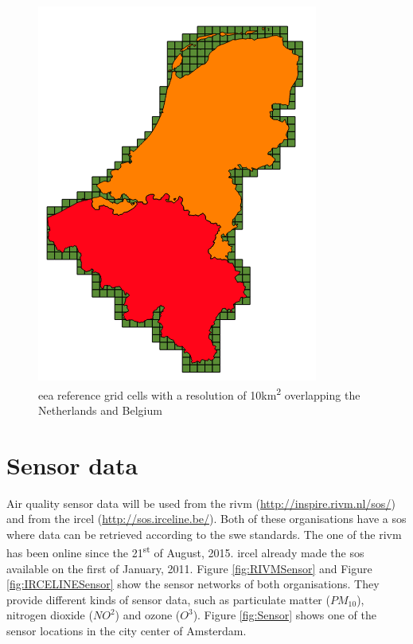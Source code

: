 \begin{figure}
	\centering
	\includegraphics[width=0.7\linewidth]{figs/EEA10km.png}
	\caption{\ac{eea} reference grid cells with a resolution of 10km\textsuperscript{2} overlapping the Netherlands and Belgium}
	\label{fig:10KM}
\end{figure}

\section{Sensor data}
Air quality sensor data will be used from the \ac{rivm} (\url{http://inspire.rivm.nl/sos/}) and from the \ac{ircel} (\url{http://sos.irceline.be/}). Both of these organisations have a \ac{sos} where data can be retrieved according to the \ac{swe} standards. The one of the \ac{rivm} has been online since the 21\textsuperscript{st} of August, 2015. \ac{ircel} already made the \ac{sos} available on the first of January, 2011. Figure \ref{fig:RIVMSensor} and Figure \ref{fig:IRCELINESensor} show the sensor networks of both organisations. They provide different kinds of sensor data, such as particulate matter ($PM_{10}$), nitrogen dioxide ($NO^{2}$) and ozone ($O^{3}$). Figure \ref{fig:Sensor} shows one of the sensor locations in the city center of Amsterdam. 


